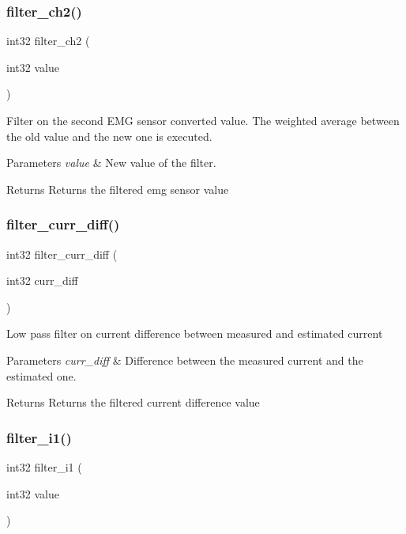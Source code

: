 \subsubsection{filter\+\_\+ch2()}
{\footnotesize\ttfamily int32 filter\+\_\+ch2 (\begin{DoxyParamCaption}\item[{int32}]{value }\end{DoxyParamCaption})}

Filter on the second E\+MG sensor converted value. The weighted average between the old value and the new one is executed.


\begin{DoxyParams}{Parameters}
{\em value} & New value of the filter.\\
\hline
\end{DoxyParams}
\begin{DoxyReturn}{Returns}
Returns the filtered emg sensor value 
\end{DoxyReturn}
\mbox{\label{utils_8h_a72883337efd7b70b783e426c47ecf689}} 
\subsubsection{filter\+\_\+curr\+\_\+diff()}
{\footnotesize\ttfamily int32 filter\+\_\+curr\+\_\+diff (\begin{DoxyParamCaption}\item[{int32}]{curr\+\_\+diff }\end{DoxyParamCaption})}

Low pass filter on current difference between measured and estimated current


\begin{DoxyParams}{Parameters}
{\em curr\+\_\+diff} & Difference between the measured current and the estimated one.\\
\hline
\end{DoxyParams}
\begin{DoxyReturn}{Returns}
Returns the filtered current difference value 
\end{DoxyReturn}
\mbox{\label{utils_8h_a3588bc1aa14c6ea245387dda7eb7ffbe}} 
\subsubsection{filter\+\_\+i1()}
{\footnotesize\ttfamily int32 filter\+\_\+i1 (\begin{DoxyParamCaption}\item[{int32}]{value }\end{DoxyParamCaption})}

